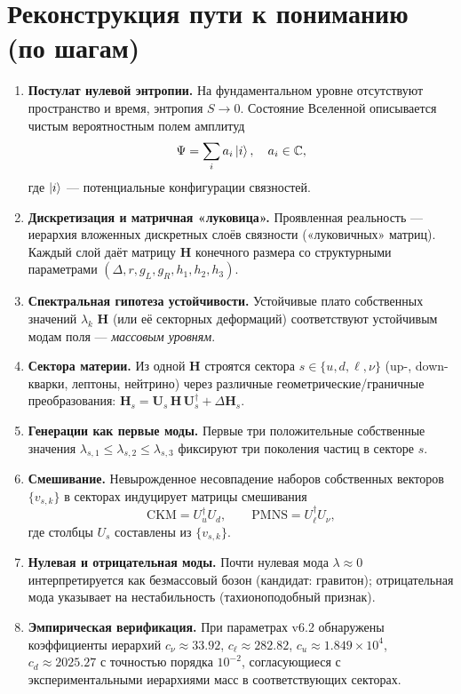 \documentclass[12pt,a4paper]{article}
\theoremstyle{definition}
\theoremstyle{plain}
\theoremstyle{remark}
\newcommand{\Hbase}{\mathbf{H}}
\newcommand{\Hs}{\mathbf{H}_{s}}
\newcommand{\U}{\mathbf{U}}
\newcommand{\C}{\mathbb{C}}
\begin{document}
\section{Реконструкция пути к пониманию (по шагам)}
\begin{enumerate}[leftmargin=1.2cm]
  \item \textbf{Постулат нулевой энтропии.} На фундаментальном уровне отсутствуют пространство и время, энтропия \(S\to 0\). Состояние Вселенной описывается чистым вероятностным полем амплитуд
  \[
  \Psi=\sum_i a_i \ket{i},\quad a_i\in\C,
  \]
  где \(\ket{i}\) --- потенциальные конфигурации связностей.
  \item \textbf{Дискретизация и матричная «луковица».} Проявленная реальность --- иерархия вложенных дискретных слоёв связности («луковичных» матриц). Каждый слой даёт матрицу \(\Hbase\) конечного размера со структурными параметрами \((\Delta,r,g_L,g_R,h_1,h_2,h_3)\).
  \item \textbf{Спектральная гипотеза устойчивости.} Устойчивые плато собственных значений \(\lambda_k\) \(\Hbase\) (или её секторных деформаций) соответствуют устойчивым модам поля --- \emph{массовым уровням}.
  \item \textbf{Сектора материи.} Из одной \(\Hbase\) строятся сектора \(s\in\{u,d,\ell,\nu\}\) (up-, down-кварки, лептоны, нейтрино) через различные геометрические/граничные преобразования: \(\Hs=\U_s\,\Hbase\,\U_s^\dagger+\Delta\Hs\).
  \item \textbf{Генерации как первые моды.} Первые три положительные собственные значения \(\lambda_{s,1}\le \lambda_{s,2}\le \lambda_{s,3}\) фиксируют три поколения частиц в секторе \(s\).
  \item \textbf{Смешивание.} Невырожденное несовпадение наборов собственных векторов \(\{v_{s,k}\}\) в секторах индуцирует матрицы смешивания
  \[
  \mathrm{CKM}=U_u^\dagger U_d,\qquad \mathrm{PMNS}=U_\ell^\dagger U_\nu,
  \]
  где столбцы \(U_s\) составлены из \(\{v_{s,k}\}\).
  \item \textbf{Нулевая и отрицательная моды.} Почти нулевая мода \(\lambda\approx 0\) интерпретируется как безмассовый бозон (кандидат: гравитон); отрицательная мода указывает на нестабильность (тахионоподобный признак).
  \item \textbf{Эмпирическая верификация.} При параметрах v6.2 обнаружены коэффициенты иерархий \(c_\nu\approx 33.92\), \(c_\ell\approx 282.82\), \(c_u\approx 1.849\times 10^4\), \(c_d\approx 2025.27\) с точностью порядка \(10^{-2}\), согласующиеся с экспериментальными иерархиями масс в соответствующих секторах.
\end{enumerate}
\end{document}
